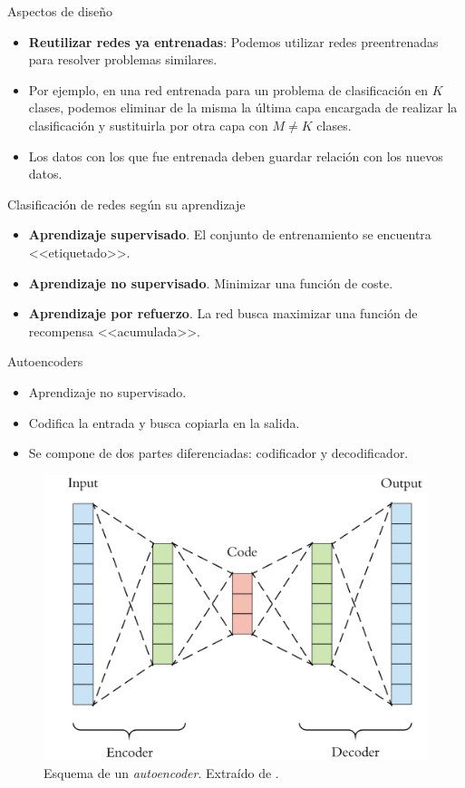 \documentclass[spanish]{beamer}
\begin{document}
\begin{frame}{Aspectos de diseño}
  \begin{itemize}
    \item \textbf{Reutilizar redes ya entrenadas}: Podemos utilizar redes preentrenadas para resolver problemas similares.

    \item Por ejemplo, en una red entrenada para un problema de clasificación en $K$ clases, podemos eliminar de la misma la última capa encargada de realizar la clasificación y sustituirla por otra capa con $M \neq K$ clases.

    \item Los datos con los que fue entrenada deben guardar relación con los nuevos datos.
  \end{itemize}

\end{frame}

\begin{frame}{Clasificación de redes según su aprendizaje}
      \begin{itemize}
      \item \textbf{Aprendizaje supervisado}. El conjunto de entrenamiento se
        encuentra <<etiquetado>>.
      \item \textbf{Aprendizaje no supervisado}. Minimizar una función de coste.
      \item \textbf{Aprendizaje por refuerzo}. La red busca maximizar una función de
        recompensa <<acumulada>>.
      \end{itemize}
\end{frame}

\begin{frame}{Autoencoders}
\begin{itemize}
\item Aprendizaje no supervisado.
\item Codifica la entrada y busca copiarla en la salida.
\item Se compone de dos partes diferenciadas: codificador y decodificador.
\end{itemize}
\vspace{1em}

\begin{figure}[h]
  \centering
  \includegraphics[width=.5\textwidth]{img/autoencoder}
  \caption{Esquema de un \textit{autoencoder}. Extraído de \parencite{arden_autoencoder_2017}.}
  \label{fig:autoencoder}
\end{figure}
\end{frame}
\end{document}
